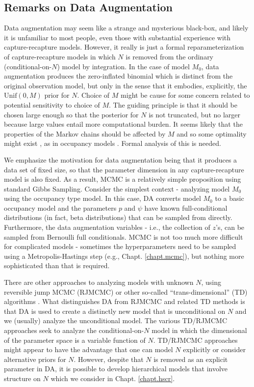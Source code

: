 \subsection{Remarks on Data Augmentation}

Data augmentation may seem like a strange and mysterious black-box,
and likely it is unfamiliar to most people, even those with substantial
experience with capture-recapture models. However, it really is just a
formal reparameterization of capture-recapture models in which $N$ is
removed from the ordinary (conditional-on-$N$) model by integration.
In the case of model $M_0$, data augmentation produces the zero-inflated
binomial which is distinct from the original observation model, but
only in the sense that it embodies, explicitly, the $\mbox{Unif}(0,M)$
prior for $N$.  Choice of $M$ might be cause for some concern related
to potential sensitivity to choice of $M$. The guiding principle is
that it should be chosen large enough so that the posterior for $N$ is
not truncated, but no larger because large values entail more
computational burden. It seems likely that the properties of the
Markov chains should be affected by $M$ and so some optimality might
exist \citep{gopalaswamy_etal:2012}, as in occupancy models
\citep{mackenzie_royle:2005}. Formal analysis of this is needed.


We emphasize the motivation for data augmentation being that it
produces a data set of fixed size, so that the parameter dimension in
any capture-recapture model is also fixed.  As a result, MCMC is a
relatively simple proposition using standard Gibbs Sampling.  Consider
the simplest context - analyzing model $M_0$ using the occupancy type
model. In this case, DA converts model $M_0$ to a basic occupancy model
and the parameters $p$ and $\psi$ have known full-conditional
distributions (in fact, beta distributions) that can be sampled from
directly.  Furthermore, the data augmentation variables - i.e., the collection 
of $z$'s, can be sampled from Bernoulli full
conditionals. MCMC is not too much more difficult for complicated
models - sometimes the hyperparameters need to be sampled using a
Metropolis-Hastings step (e.g., Chapt. \ref{chapt.mcmc}), but nothing more sophisticated than that is
required.

There are other approaches to analyzing models with unknown $N$, using
reversible jump MCMC (RJMCMC) or other so-called ``trans-dimensional''
(TD) algorithms
 \citep{durban_elston:2005, king_brooks:2001, king_etal:2008,
schofield_barker:2008, wright_etal:2009}. What distinguishes DA from RJMCMC and
related TD methods is that DA is used to create a distinctly new model
that is unconditional on $N$ and we (usually) analyze the
unconditional model. The various TD/RJMCMC approaches seek to analyze
the conditional-on-$N$ model in which the dimensional of the parameter
space is a variable function of $N$. TD/RJMCMC approaches might appear
to have the advantage that one can model $N$ explicitly or consider
alternative priors for $N$. However, despite that $N$ is removed as an
explicit parameter in DA, it is possible to develop hierarchical
models that involve structure on $N$ \citep{converse_royle:2010,
  royle_etal:2011ms} which we consider in Chapt. \ref{chapt.hscr}.

